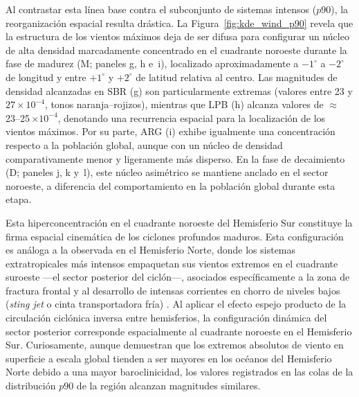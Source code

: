 Al contrastar esta línea base contra el subconjunto de sistemas intensos ($p90$), la reorganización espacial resulta drástica. La Figura~\ref{fig:kde_wind_p90} revela que la estructura de los vientos máximos deja de ser difusa para configurar un núcleo de alta densidad marcadamente concentrado en el cuadrante noroeste durante la fase de madurez (M; paneles g, h e~i), localizado aproximadamente a $-1^{\circ}$ a $-2^{\circ}$ de longitud y entre $+1^{\circ}$ y $+2^{\circ}$ de latitud relativa al centro. Las magnitudes de densidad alcanzadas en SBR (g) son particularmente extremas (valores entre 23 y $27 \times 10^{-4}$, tonos naranja--rojizos), mientras que LPB (h) alcanza valores de ${\approx}$\,23--25\,$\times 10^{-4}$, denotando una recurrencia espacial para la localización de los vientos máximos. Por su parte, ARG (i) exhibe igualmente una concentración respecto a la población global, aunque con un núcleo de densidad comparativamente menor y ligeramente más disperso. En la fase de decaimiento (D; paneles j, k y~l), este núcleo asimétrico se mantiene anclado en el sector noroeste, a diferencia del comportamiento en la población global durante esta etapa.

Esta hiperconcentración en el cuadrante noroeste del Hemisferio Sur constituye la firma espacial cinemática de los ciclones profundos maduros. Esta configuración es análoga a la observada en el Hemisferio Norte, donde los sistemas extratropicales más intensos empaquetan sus vientos extremos en el cuadrante suroeste ---el sector posterior del ciclón---, asociados específicamente a la zona de fractura frontal y al desarrollo de intensas corrientes en chorro de niveles bajos (\textit{sting jet} o cinta transportadora fría) \citep{clark2005sting, han2025system}. Al aplicar el efecto espejo producto de la circulación ciclónica inversa entre hemisferios, la configuración dinámica del sector posterior corresponde espacialmente al cuadrante noroeste en el Hemisferio Sur. Curiosamente, aunque \citet{stankovic2025surface} demuestran que los extremos absolutos de viento en superficie a escala global tienden a ser mayores en los océanos del Hemisferio Norte debido a una mayor baroclinicidad, los valores registrados en las colas de la distribución $p90$ de la región alcanzan magnitudes similares.

